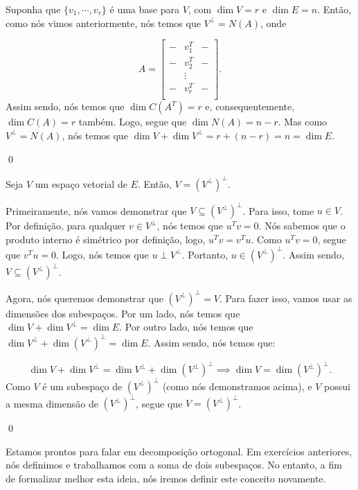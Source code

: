 \begin{Proof}
	Suponha que $\{v_1, \cdots, v_r\}$ é uma base para $V$, com $\dim V = r$ e $\dim E = n$. Então, como nós vimos anteriormente, nós temos que $V^\perp = N(A)$, onde
	
	$$
	A = \begin{bmatrix}
		- & v_1^T & - \\
		- & v_2^T & - \\
		& \vdots & \\
		- & v_r^T & - \\
	\end{bmatrix}.
	$$
	Assim sendo, nós temos que $\dim C(A^T) = r$ e, consequentemente, $\dim C(A) = r$ também. Logo, segue que $\dim N(A) = n - r$. Mas como $V^\perp = N(A)$, nós temos que $\dim V + \dim V^\perp = r + (n - r) = n = \dim E$.
	
	\qed
\end{Proof}

\begin{Proposition}
	Seja $V$ um espaço vetorial de $E$. Então, $V = (V^\perp)^\perp$.
\end{Proposition}

\begin{Proof}
	Primeiramente, nós vamos demonstrar que $V\subseteq(V^\perp)^\perp$. Para isso, tome $u\in V$. Por definição, para qualquer $v\in V^\perp$, nós temos que $u^Tv = 0$. Nós sabemos que o produto interno é simétrico por definição, logo, $u^Tv = v^Tu$. Como $u^Tv = 0$, segue que $v^Tu = 0$. Logo, nós temos que $u\perp V^\perp$. Portanto, $u\in(V^\perp)^\perp$. Assim sendo, $V\subseteq(V^\perp)^\perp$.
	
	Agora, nós queremos demonstrar que $(V^\perp)^\perp = V$. Para fazer isso, vamos usar as dimensões dos subespaços. Por um lado, nós temos que $\dim V + \dim V^\perp = \dim E$. Por outro lado, nós temos que $\dim V^\perp + \dim (V^\perp)^\perp = \dim E$. Assim sendo, nós temos que:
	
	$$
	\dim V + \dim V^\perp = \dim V^\perp + \dim (V^\perp)^\perp \implies \dim V = \dim (V^\perp)^\perp.
	$$
	Como $V$ é um subespaço de $(V^\perp)^\perp$ (como nós demonstramos acima), e $V$ possui a mesma dimensão de $(V^\perp)^\perp$, segue que $V = (V^\perp)^\perp$.
	
	\qed
\end{Proof}

Estamos prontos para falar em decomposição ortogonal. Em exercícios anteriores, nós definimos e trabalhamos com a soma de dois subespaços. No entanto, a fim de formalizar melhor esta ideia, nós iremos definir este conceito novamente.

